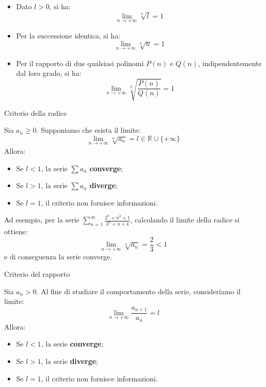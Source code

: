 \documentclass[12pt]{report}
\newcommand{\R}{\mathbb{R}}
\begin{document}
	\begin{itemize}
		
		\item Dato $l > 0$, si ha:
		\[
		\lim_{n \to +\infty} \sqrt[n]{l} = 1
		\]
		
		\item Per la successione identica, si ha:
		\[
		\lim_{n \to +\infty} \sqrt[n]{n} = 1
		\]
		
		\item Per il rapporto di due qualsiasi polinomi $P(n)$ e $Q(n)$, indipendentemente dal loro grado, si ha:
		\[
		\lim_{n \to +\infty} \sqrt[n]{\frac{P(n)}{Q(n)}} = 1
		\]
		
	\end{itemize}
	
	\begin{teorema}{Criterio della radice}{}
		
		Sia $a_n \geq 0$. Supponiamo che esista il limite:
		\[
		\lim_{n \to +\infty} \sqrt[n]{a_n} = l \in \R \cup \{+\infty\}
		\]
		Allora:
		\begin{itemize}
			
			\item Se $l < 1$, la serie $\sum a_n$ \textbf{converge};
			
			\item Se $l > 1$, la serie $\sum a_n$ \textbf{diverge};
			
			\item Se $l = 1$, il criterio non fornisce informazioni.
			
		\end{itemize}
		
	\end{teorema}
	
	Ad esempio, per la serie $\sum_{n=1}^{\infty} \frac{2^n+n^2+1}{3^n+n+4}$, calcolando il limite della radice si ottiene:
	\[
	\lim_{n \to +\infty} \sqrt[n]{a_n} = \frac{2}{3} < 1
	\]
	e di conseguenza la serie converge.
	
	\begin{teorema}{Criterio del rapporto}{}
		
		Sia $a_n > 0$. Al fine di studiare il comportamento della serie, consideriamo il limite:
		\[
		\lim_{n \to +\infty} \frac{a_{n+1}}{a_n} = l
		\]
		Allora:
		\begin{itemize}
			
			\item Se $l < 1$, la serie \textbf{converge};
			
			\item Se $l > 1$, la serie \textbf{diverge};
			
			\item Se $l = 1$, il criterio non fornisce informazioni.
			
		\end{itemize}
		
	\end{teorema}
	
\end{document}
